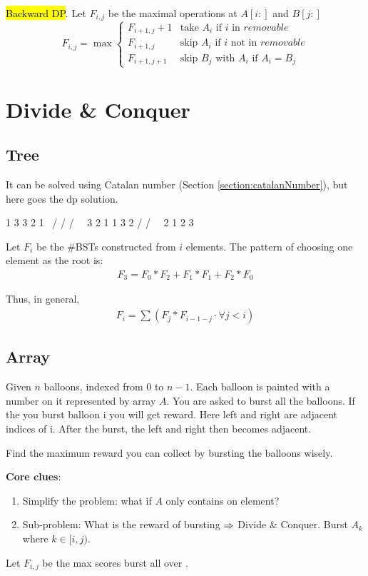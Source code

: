 \hl{Backward DP}. Let $F_{i,j}$ be the maximal operations at $A[i:]$ and $B[j:]$
\[
F_{i,j} = \max
\begin{cases}
F_{i+1,j} + 1 &\text{take $A_i$ if $i$ in $removable$}\\
F_{i+1,j} &\text{skip $A_i$ if $i$ not in $removable$} \\
F_{i+1,j+1}&\text{skip $B_j$ with $A_i$ if $A_i = B_j$}
\end{cases}
\]

\section{Divide \& Conquer}
\subsection{Tree}
 It can be solved using Catalan number (Section \ref{section:catalanNumber}), but here goes the dp solution. 
\begin{java}
   1         3     3      2      1
    \       /     /      / \      \
     3     2     1      1   3      2
    /     /       \                 \
   2     1         2                 3
\end{java}

Let $F_i$ be the \#BSTs constructed from $i$ elements. The pattern of choosing one element as the root is: 
\begin{align*}
F_3 = F_0*F_2 + F_1*F_1 + F_2*F_0
\end{align*}

Thus, in general, 
\begin{align*}
F_i = \sum(F_{j}*F_{i-1-j} \cdot \forall j< i)
\end{align*}

\subsection{Array}
 Given $n$ balloons, indexed from 0 to $n-1$. Each balloon is painted with a number on it represented by array $A$. You are asked to burst all the balloons. If the you burst balloon i you will get  reward. Here left and right are adjacent indices of i. After the burst, the left and right then becomes adjacent.

Find the maximum reward you can collect by bursting the balloons wisely.

\textbf{Core clues}:
\begin{enumerate}
\item Simplify the problem: what if $A$ only contains on element? 
\item Sub-problem: What is the reward of bursting  $\Rightarrow$ Divide \& Conquer. Burst $A_k$ where $k \in [i, j)$. 
\end{enumerate}
Let $F_{i, j}$ be the max scores burst all over \pythoninline{A[i:j]}.

